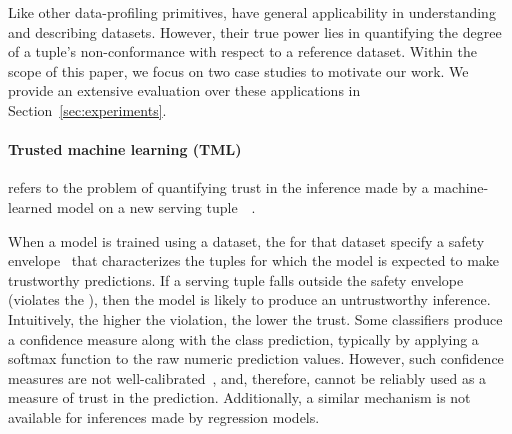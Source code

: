 
 Like other data-profiling primitives, \dis have general
applicability in understanding and describing datasets. However, their true
power lies in quantifying the degree of a tuple's non-conformance with respect
to a reference dataset. Within the scope of this paper, we focus on two case
studies
to motivate our work.
We provide an extensive evaluation over these applications in
Section~\ref{sec:experiments}.


\smallskip

 \paragraph{Trusted machine learning (TML)} refers to the problem
of quantifying trust in the inference made by a machine-learned model on a new
serving tuple~~\cite{DBLP:conf/hicons/TiwariDJCLRSS14,
DBLP:journals/crossroads/Varshney19, DBLP:journals/corr/abs-1904-07204,
DBLP:conf/kdd/Ribeiro0G16, DBLP:conf/nips/JiangKGG18}.
%
%
When a model is trained using a dataset, the \dis for that dataset specify a
safety envelope~\cite{DBLP:conf/hicons/TiwariDJCLRSS14} that characterizes the
tuples for which the model is expected to make trustworthy predictions. If a
serving tuple falls outside the safety envelope (violates the \dis), then the
model is likely to produce an untrustworthy inference. Intuitively, the higher
the violation, the lower the trust. Some classifiers produce a confidence
measure along with the class prediction, typically by applying a softmax
function to the raw numeric prediction values. However, such confidence
measures are not well-calibrated~\cite{DBLP:conf/nips/JiangKGG18,
guo2017calibration}, and, therefore, cannot be reliably used as a measure of
trust in the prediction. Additionally, a similar mechanism is not available for
inferences made by regression models.

